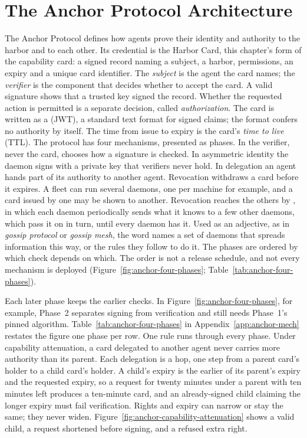 \documentclass[11pt,a4paper]{article}
\theoremstyle{definition}
\begin{document}
\section{The Anchor Protocol Architecture}\label{sec:architecture}
The Anchor Protocol defines how agents prove their identity and authority to
the harbor and to each other. Its credential is the Harbor Card, this chapter's
form of the capability card: a signed record naming a subject, a harbor,
permissions, an expiry and a unique card identifier. The \emph{subject} is the
agent the card names; the \emph{verifier} is the component that decides whether
to accept the card. A valid signature shows that a trusted key signed the
record. Whether the requested action is permitted is a separate decision,
called \emph{authorization}. The card is written as a 
(JWT), a standard text format for signed claims; the format confers no
authority by itself. The time from issue to expiry is the card's \emph{time to
live} (TTL). The protocol has four mechanisms, presented as phases. In
 the verifier, never the card, chooses how a
signature is checked. In asymmetric identity the daemon signs with a private
key that verifiers never hold. In delegation an agent hands part of its
authority to another agent. Revocation withdraws a card before it
expires. A fleet can run several daemons, one per machine for example, and a
card issued by one may be shown to another. Revocation reaches the others by
, in which each daemon periodically sends what it knows to a few
other daemons, which pass it on in turn, until every daemon has it. Used as an adjective, as in
\emph{gossip protocol} or \emph{gossip mesh}, the word names a set of daemons
that spreads information this way, or the rules they follow to do it. The phases
are ordered by which check depends on which. The order is not a release
schedule, and not every mechanism is deployed
(Figure~\ref{fig:anchor-four-phases}; Table~\ref{tab:anchor-four-phases}).


Each later phase keeps the earlier checks. In Figure~\ref{fig:anchor-four-phases},
for example, Phase~2 separates signing from verification and still needs
Phase~1's pinned algorithm. Table~\ref{tab:anchor-four-phases} in
Appendix~\ref{app:anchor-mech} restates the figure one phase per row.
One rule runs through every phase. Under capability attenuation, a card delegated to another agent never carries more authority than its parent. Each delegation is a hop, one step from a parent card's holder to a child card's holder. A child's expiry is the earlier of its parent's expiry and the requested expiry, so a request for twenty minutes under a parent with ten minutes left produces a ten-minute card, and an already-signed child claiming the longer expiry must fail verification. Rights and expiry can narrow or stay the same; they never widen. Figure~\ref{fig:anchor-capability-attenuation} shows a valid child, a request shortened before signing, and a refused extra right.
\end{document}
